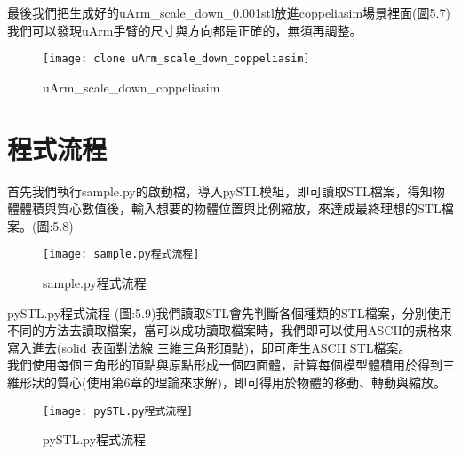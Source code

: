 最後我們把生成好的uArm_scale_down_0.001stl放進coppeliasim場景裡面(圖5.7)我們可以發現uArm手臂的尺寸與方向都是正確的，無須再調整。\\

\begin{figure}[hbt!]
\begin{center}
\texttt{[image: clone uArm\_scale\_down\_coppeliasim]}
\caption{\Large uArm_scale_down_coppeliasim}\label{uArm_scale_down_coppeliasim}
\end{center}
\end{figure}

\section{程式流程}

首先我們執行sample.py的啟動檔，導入pySTL模組，即可讀取STL檔案，得知物體體積與質心數值後，輸入想要的物體位置與比例縮放，來達成最終理想的STL檔案。(圖:5.8)\\

\begin{figure}[hbt!]
\begin{center}
\texttt{[image: sample.py程式流程]}
\caption{\Large sample.py程式流程}\label{sample.py程式流程}
\end{center}
\end{figure}

\item pySTL.py程式流程
(圖:5.9)我們讀取STL會先判斷各個種類的STL檔案，分別使用不同的方法去讀取檔案，當可以成功讀取檔案時，我們即可以使用ASCII的規格來寫入進去(solid	表面對法線	三維三角形頂點)，即可產生ASCII STL檔案。\\

    我們使用每個三角形的頂點與原點形成一個四面體，計算每個模型體積用於得到三維形狀的質心(使用第6章的理論來求解)，即可得用於物體的移動、轉動與縮放。\\

\begin{figure}[hbt!]
\begin{center}
\texttt{[image: pySTL.py程式流程]}
\caption{\Large pySTL.py程式流程}\label{pySTL.py程式流程}
\end{center}
\end{figure}


